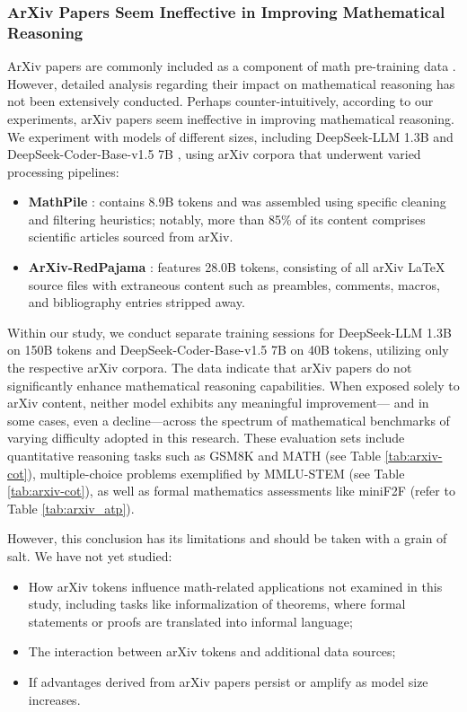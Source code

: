 \begin{itemize}[topsep=0pt]
\begin{itemize}[topsep=0pt]
\subsubsection{ArXiv Papers Seem Ineffective in Improving Mathematical Reasoning}

ArXiv papers are commonly included as a component of math pre-training data \citep{minerva,gpt-f,llemma,mathpile}. However, detailed analysis regarding their impact on mathematical reasoning has not been extensively conducted. Perhaps counter-intuitively, according to our experiments, arXiv papers seem ineffective in improving mathematical reasoning. We experiment with models of different sizes, including DeepSeek-LLM 1.3B and DeepSeek-Coder-Base-v1.5 7B \citep{deepseek-coder}, using arXiv corpora that underwent varied processing pipelines:

\begin{itemize}[topsep=0pt]
    \item \textbf{MathPile} \citep{mathpile}: contains 8.9B tokens and was assembled using specific cleaning and filtering heuristics; notably, more than 85\% of its content comprises scientific articles sourced from arXiv.
    \item \textbf{ArXiv-RedPajama} \citep{redpajama}: features 28.0B tokens, consisting of all arXiv LaTeX source files with extraneous content such as preambles, comments, macros, and bibliography entries stripped away.
\end{itemize}

Within our study, we conduct separate training sessions for DeepSeek-LLM 1.3B on 150B tokens and DeepSeek-Coder-Base-v1.5 7B on 40B tokens, utilizing only the respective arXiv corpora. The data indicate that arXiv papers do not significantly enhance mathematical reasoning capabilities. When exposed solely to arXiv content, neither model exhibits any meaningful improvement— and in some cases, even a decline—across the spectrum of mathematical benchmarks of varying difficulty adopted in this research. These evaluation sets include quantitative reasoning tasks such as GSM8K and MATH (see Table \ref{tab:arxiv-cot}), multiple-choice problems exemplified by MMLU-STEM (see Table \ref{tab:arxiv-cot}), as well as formal mathematics assessments like miniF2F (refer to Table \ref{tab:arxiv_atp}).

However, this conclusion has its limitations and should be taken with a grain of salt. We have not yet studied:

\begin{itemize}[topsep=0pt]
    \item How arXiv tokens influence math-related applications not examined in this study, including tasks like informalization of theorems, where formal statements or proofs are translated into informal language;
    \item The interaction between arXiv tokens and additional data sources;
    \item If advantages derived from arXiv papers persist or amplify as model size increases.
\end{itemize}


\end{itemize}
\end{itemize}
